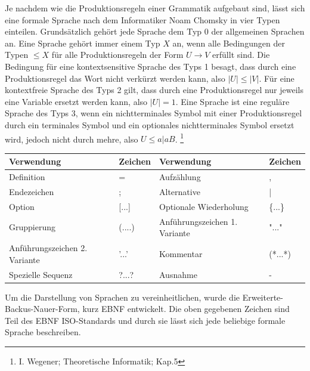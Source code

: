 Je nachdem wie die Produktionsregeln einer Grammatik aufgebaut sind, lässt sich eine formale Sprache nach dem Informatiker Noam Chomsky in vier Typen einteilen. 
Grundsätzlich gehört jede Sprache dem Typ 0 der allgemeinen Sprachen an. 
Eine Sprache gehört immer einem Typ $X$ an, wenn alle Bedingungen  der Typen $\leq X$ für alle Produktionsregeln der Form $U \rightarrow V$ erfüllt sind. 
Die Bedingung für eine kontextsensitive Sprache des Typs 1 besagt, dass durch eine Produktionsregel das Wort nicht verkürzt werden kann, also $|U| \leq |V|$. 
Für eine kontextfreie Sprache des Typs 2 gilt, dass durch eine Produktionsregel nur jeweils eine Variable ersetzt werden kann, also $|U| = 1$. 
Eine Sprache ist eine reguläre Sprache des Typs 3, wenn ein nichtterminales Symbol mit einer Produktionsregel durch ein terminales Symbol und ein optionales nichtterminales Symbol ersetzt wird, jedoch nicht durch mehre, also $U \leq a|aB$. \footnote{I. Wegener;	Theoretische Informatik; Kap.5}\\
\begin{table}[h!]
\begin{tabular}{|ll|ll|}
\hline
Verwendung                    & Zeichen   & Verwendung                    & Zeichen \\ \hline
Definition                    & =         & Aufzählung                    & ,       \\
Endezeichen                   & ;         & Alternative                   & |       \\
Option                        & {[}...{]} & Optionale Wiederholung        & \{...\} \\
Gruppierung                   & (....)    & Anführungszeichen 1. Variante & "..."   \\
Anführungszeichen 2. Variante & '...'     & Kommentar                      & (*...*) \\
Spezielle Sequenz             & ?...?     & Ausnahme                      & -       \\ \hline
\end{tabular}
\end{table}
Um die Darstellung von Sprachen zu vereinheitlichen, wurde die Erweiterte-Backus-Nauer-Form, kurz EBNF entwickelt. 
Die oben gegebenen Zeichen sind Teil des EBNF ISO-Standards und durch sie lässt sich jede beliebige formale Sprache beschreiben.\\
 
